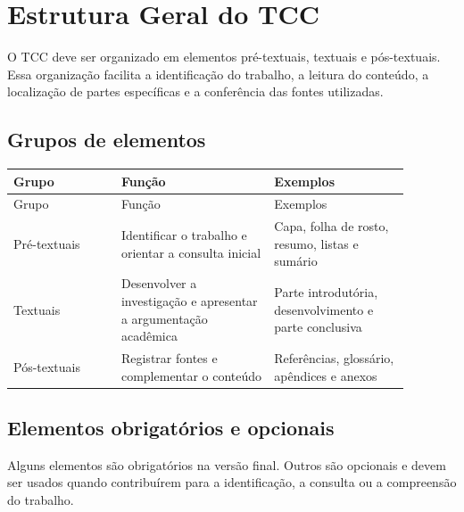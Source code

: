 \chapter{Estrutura Geral do TCC}

O TCC deve ser organizado em elementos pré-textuais, textuais e pós-textuais. Essa organização facilita a identificação do trabalho, a leitura do conteúdo, a localização de partes específicas e a conferência das fontes utilizadas.

\section{Grupos de elementos}

\begin{longtable}{p{0.24\linewidth}p{0.34\linewidth}p{0.30\linewidth}}
\toprule
Grupo & Função & Exemplos \\
\midrule
\endfirsthead
\toprule
Grupo & Função & Exemplos \\
\midrule
\endhead
Pré-textuais & Identificar o trabalho e orientar a consulta inicial & Capa, folha de rosto, resumo, listas e sumário \\
Textuais & Desenvolver a investigação e apresentar a argumentação acadêmica & Parte introdutória, desenvolvimento e parte conclusiva \\
Pós-textuais & Registrar fontes e complementar o conteúdo & Referências, glossário, apêndices e anexos \\
\bottomrule
\end{longtable}

\section{Elementos obrigatórios e opcionais}

Alguns elementos são obrigatórios na versão final. Outros são opcionais e devem ser usados quando contribuírem para a identificação, a consulta ou a compreensão do trabalho.

\requisitonormativo

